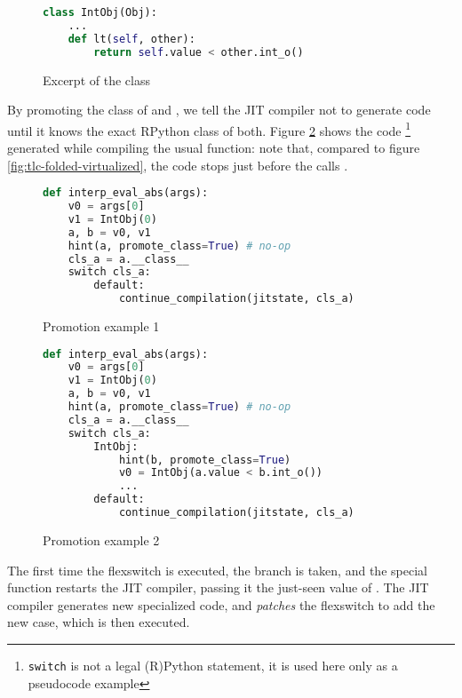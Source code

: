 \begin{figure}[h]
\begin{center}
\begin{lstlisting}[language=Python]
class IntObj(Obj):
    ...
    def lt(self, other): 
        return self.value < other.int_o()
\end{lstlisting}
\caption{Excerpt of the  class}
\label{fig:tlc-intobj}
\end{center}
\end{figure}

By promoting the class of  and , we tell the JIT
compiler not to generate code until it knows the exact RPython class of both.
Figure \ref{fig:tlc-abs-promotion-1} shows the
code \footnote{\lstinline{switch} is not a legal (R)Python statement, it is
  used here only as a pseudocode example} generated while compiling the usual
 function: note that, compared to figure
\ref{fig:tlc-folded-virtualized}, the code stops just before the calls
.

\begin{figure}[h]
\begin{center}
\begin{lstlisting}[language=Python]
def interp_eval_abs(args):
    v0 = args[0]
    v1 = IntObj(0)
    a, b = v0, v1
    hint(a, promote_class=True) # no-op
    cls_a = a.__class__
    switch cls_a:
        default: 
            continue_compilation(jitstate, cls_a)
\end{lstlisting}
\caption{Promotion example 1}
\label{fig:tlc-abs-promotion-1}
\end{center}
\end{figure}

\begin{figure}[h]
\begin{center}
\begin{lstlisting}[language=Python]
def interp_eval_abs(args):
    v0 = args[0]
    v1 = IntObj(0)
    a, b = v0, v1
    hint(a, promote_class=True) # no-op
    cls_a = a.__class__
    switch cls_a:
        IntObj:
            hint(b, promote_class=True)
            v0 = IntObj(a.value < b.int_o())
            ...
        default: 
            continue_compilation(jitstate, cls_a)
\end{lstlisting}
\caption{Promotion example 2}
\label{fig:tlc-abs-promotion-2}
\end{center}
\end{figure}

The first time the flexswitch is executed, the  branch is
taken, and the special function  restarts the
JIT compiler, passing it the just-seen value of .  The JIT
compiler generates new specialized code, and \emph{patches} the flexswitch to
add the new case, which is then executed.

